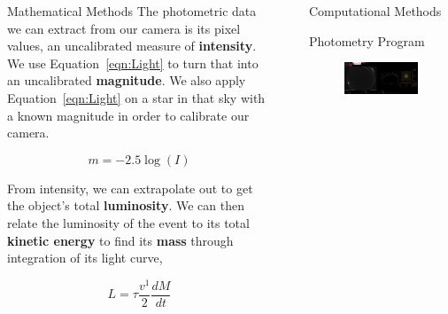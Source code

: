 \documentclass[final]{beamer}
\newlength{\sepwid}
\newlength{\twocolwid}
\begin{document}
\begin{frame}[t]
\begin{columns}[t]
\begin{column}{\twocolwid}
\begin{block}{Mathematical Methods}
The photometric data we can extract from our camera is its pixel values, an uncalibrated measure of \textbf{intensity}. We use Equation~\ref{eqn:Light} to turn that into an uncalibrated \textbf{magnitude}. We also apply Equation~\ref{eqn:Light} on a star in that sky with a known magnitude in order to calibrate our camera.

\begin{equation}
m = -2.5 \log(I)
\label{eqn:Light}
\end{equation}

From intensity, we can extrapolate out to get the object's total \textbf{luminosity}. We can then relate the luminosity of the event to its total \textbf{kinetic energy} to find its \textbf{mass} through integration of its light curve,

\begin{equation}
L = \tau \frac{v^1}{2} \frac{dM}{dt}
\label{eq:Mass}
\end{equation}
\end{block}

\end{column} %

\begin{column}{\sepwid}\end{column} %

\begin{column}{\twocolwid} %

\begin{block}{Computational Methods}

\begin{alertblock}{Photometry Program}
\begin{figure}
	\centering
	\includegraphics[width=\linewidth]{ProgramLandscape.png}
	\label{fig:}
\end{figure}
\vspace{-1.5cm}
\end{alertblock}
\end{block}


\end{column}
\end{columns}
\end{frame}
\end{document}

